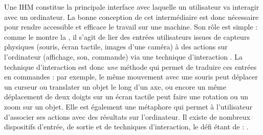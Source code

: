 
Une IHM constitue la principale interface avec laquelle un utilisateur va interagir avec un ordinateur. La bonne conception de cet intermédiaire est donc nécessaire pour rendre accessible et efficace le travail sur une machine. Son rôle est simple : comme le montre la , il s'agit de lier des entrées utilisateurs issues de capteurs physiques (souris, écran tactile, images d'une caméra) à des actions sur l'ordinateur (affichage, son, commande) via une technique d'interaction \citep{Billinghurst2005}. La technique d'interaction est donc \emph{une} méthode qui permet de traduire ces entrées en commandes : par exemple, le même mouvement avec une souris peut déplacer un curseur ou translater un objet le long d'un axe, ou encore un même déplacement de deux doigts sur un écran tactile peut faire une rotation ou un zoom sur un objet. Elle est également une métaphore qui permet à l'utilisateur d'associer ses actions avec des résultats sur l'ordinateur. Il existe de nombreux dispositifs d'entrée, de sortie et de techniques d'interaction, le défi étant de :  \citep{Billinghurst2005}.

